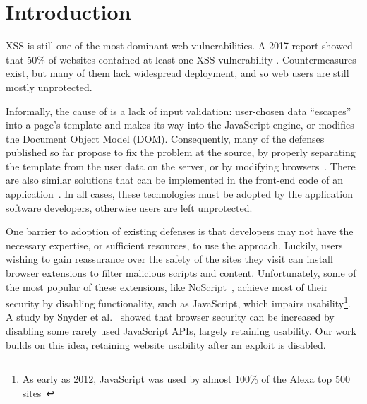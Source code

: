 \section{Introduction} \label{introduction}

\ac{XSS} is still one of the most dominant web vulnerabilities. A 2017
report showed that 50\% of websites contained at least one \ac{XSS}
vulnerability \cite{Acunetix}. Countermeasures exist, but many of them
lack widespread deployment, and so web users are still mostly
unprotected.

Informally, the cause of \xss is a lack of input validation:
user-chosen data ``escapes'' into a page's template and makes its way
into the JavaScript engine, or modifies the Document Object Model (DOM).
%
Consequently, many of the \xss defenses published so far
propose to fix the problem at the source, by properly separating the
template from the user data on the server, or by modifying
browsers~\cite{10.1145/1368088.1368112, Jim:2007:DSI:1242572.1242654,nadji2009document,Wurzinger:2009:SMX:1656360.1656379,Sundareswaran:2012:XHS:2352970.2352994}.
%
There are also similar solutions that can be implemented in the
front-end code of an application~\cite{10.1007/978-3-319-66399-9_7}.
In all cases, these technologies must be adopted by the application
software developers, otherwise users are left unprotected.

One barrier to adoption of existing \xss defenses is that developers may not have the
necessary expertise, or sufficient resources, to use the approach.
%
%
Luckily, users wishing to gain reassurance over the safety of the
sites they visit can install browser extensions to filter malicious
scripts and content. Unfortunately, some of the most popular of these
extensions, like NoScript~\cite{Noscript}, achieve most of their security
by disabling functionality, such as JavaScript, which
impairs usability\footnote{As early as 2012, 
JavaScript was used by almost 100\% of the Alexa top 500 sites~\cite{Stock:2017:WTI:3241189.3241265}}.
A study by Snyder et al.~\cite{Snyder:2017:MWD:3133956.3133966}
showed that browser security can be increased by disabling some rarely used
JavaScript APIs, largely retaining usability. Our work builds on this idea,
retaining website usability after an exploit is disabled.

